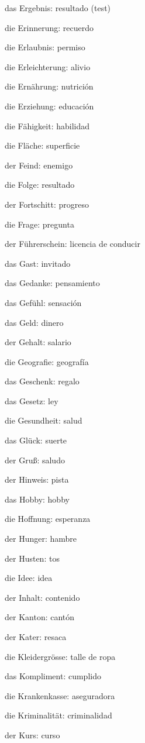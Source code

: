 \begin{multicols}{2}
\begin{myitemize}
\item das Ergebnis: resultado (test)
\item die Erinnerung: recuerdo
\item die Erlaubnis: permiso
\item die Erleichterung: alivio
\item die Ernährung: nutrición
\item die Erziehung: educación
\item die Fähigkeit: habilidad
\item die Fläche: superficie
\item der Feind: enemigo
\item die Folge: resultado
\item der Fortschitt: progreso
\item die Frage: pregunta
\item der Führerschein: licencia de conducir
\item das Gast: invitado
\item das Gedanke: pensamiento
\item das Gefühl: sensación
\item das Geld: dinero
\item der Gehalt: salario
\item die Geografie: geografía
\item das Geschenk: regalo
\item das Gesetz: ley
\item die Gesundheit: salud
\item das Glück: suerte
\item der Gruß: saludo
\item der Hinweis: pista
\item das Hobby: hobby
\item die Hoffnung: esperanza
\item der Hunger: hambre
\item der Husten: tos
\item die Idee: idea
\item der Inhalt: contenido
\item der Kanton: cantón
\item der Kater: resaca
\item die Kleidergrösse: talle de ropa
\item das Kompliment: cumplido
\item die Krankenkasse: aseguradora
\item die Kriminalität: criminalidad
\item der Kurs: curso

\end{myitemize}
\end{multicols}
